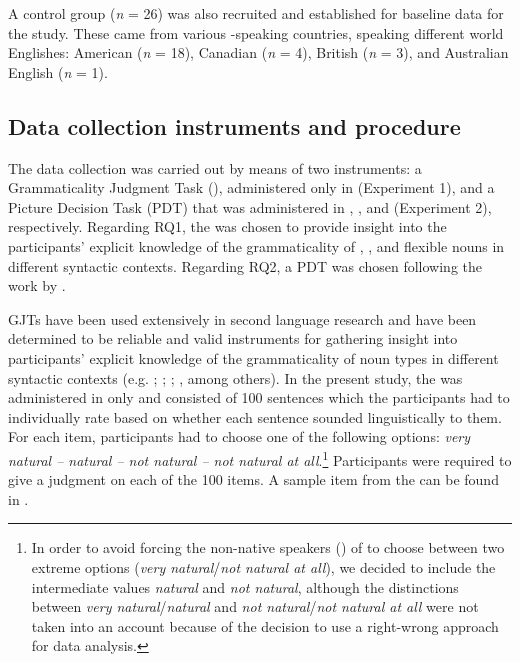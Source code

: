 \documentclass[output=paper]{langsci/langscibook}
\begin{document}
A control group (\textit{n} = 26) was also recruited and established for baseline data for the study. These  came from various -speaking countries, speaking different world Englishes: American  (\textit{n} = 18), Canadian  (\textit{n} = 4), British  (\textit{n} = 3), and  {Australian English} (\textit{n} = 1).  


\subsection{Data collection instruments and procedure}


The data collection was carried out by means of two instruments: a Grammaticality Judgment Task (), administered only in  (Experiment 1), and a Picture Decision Task (PDT) that was administered in , , and  (Experiment 2), respectively. Regarding RQ1, the  was chosen to provide insight into the participants’ explicit knowledge of the grammaticality of , , and flexible nouns in different syntactic contexts. Regarding RQ2, a PDT was chosen following the work by \citet{BarnerSnedeker2005}.

 GJTs have been used extensively in second language  research and have been determined to be reliable and valid instruments for gathering insight into participants’ explicit knowledge of the grammaticality of noun types in different syntactic contexts (e.g. \citealt{CowanHatasa1994}; \citealt{Gass1994}; \citealt{Cowart1997}; \citealt{IoninZyzik2014}, among others). In the present study, the  was administered in  only and  consisted of 100 sentences which the participants had to individually rate based on whether each sentence sounded linguistically  to them. For each item, participants had to choose one of the following options: \textit{very natural – natural – not natural – not natural at all}.\footnote{In order to avoid forcing the non-native speakers () of  to choose between two extreme options (\textit{very natural}/\textit{not natural at all}), we decided to include the intermediate values \textit{natural} and \textit{not natural}, although the distinctions between \textit{very natural}/\textit{natural} and \textit{not natural}/\textit{not natural at all} were not taken into an account because of the decision to use a right-wrong approach for data analysis.} Participants were required to give a judgment on each of the 100 items. A sample item from the  can be found in .
\end{document}

